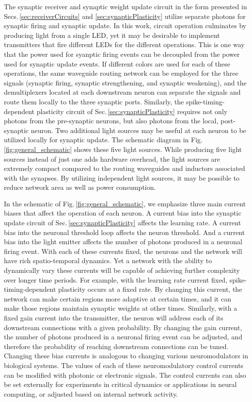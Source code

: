 \documentclass[twocolumn]{article}
\begin{document}
The synaptic receiver and synaptic weight update circuit in the form presented in Secs.\,\ref{sec:receiverCircuits} and \ref{sec:synapticPlasticity} utilize separate photons for synaptic firing and synaptic update. In this work, circuit operation culminates by producing light from a single LED, yet it may be desirable to implement transmitters that fire different LEDs for the different operations. This is one way that the power used for syanptic firing events can be decoupled from the power used for synaptic update events. If different colors are used for each of these operations, the same waveguide routing network can be employed for the three signals (synaptic firing, synaptic strengthening, and synaptic weakening), and the demultiplexers located at each downstream neuron can separate the signals and route them locally to the three synaptic ports. Similarly, the spike-timing-dependent plasticity circuit of Sec.\,\ref{sec:synapticPlasticity} requires not only photons from the pre-synaptic neurons, but also photons from the local, post-synaptic neuron. Two additional light sources may be useful at each neuron to be utilized locally for synaptic update. The schematic diagram in Fig.\,\ref{fig:general_schematic} shows these five light sources. While producing five light sources instead of just one adds hardware overhead, the light sources are extremely compact compared to the routing waveguides and inductors associated with the synapses. By utilizing independent light sources, it may be possible to reduce network area as well as power consumption.

In the schematic of Fig.\,\ref{fig:general_schematic}, we emphasize three main current biases that affect the operation of each neuron. A current bias into the synaptic update circuit of Sec.\,\ref{sec:synapticPlasticity} affects the learning rate. A current bias into the neuronal threshold loop affects the neuron threshold. And a current bias into the light emitter affects the number of photons produced in a neuronal firing event. With each of these currents fixed, the neurons and the network will have rich spatio-temporal dynamics. Yet a network with the ability to dynamically vary these currents will be capable of achieving further complexity over longer time periods. For example, with the learning rate current fixed, spike-timing-dependent plasticity occurs at a fixed rate. By changing this current, the network can make certain regions more adaptive at certain times, and it can make those regions maintain synaptic weights at other times. Similarly, with a fixed gain current into the transmitter, the neuron will address each of its downstream connections with a given probability. By changing the gain current, the number of photons produced in a neuronal firing event can be adjusted, and therefore the probability of reaching downstream connections can be tuned. Changing these bias currents is analogous to changing various neuromodulators in biological systems. The values of each of these neuromodulatory control currents can be modified with photonic or electronic signals. The control currents can also be set externally for experiments in critical dynamics or applications in neural computing, or adjusted based on internal network activity.
\end{document}
